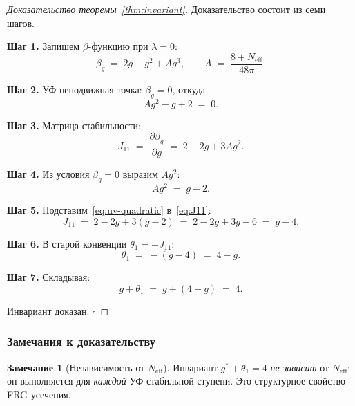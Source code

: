 \documentclass[11pt,a4paper]{article}
\theoremstyle{definition}
\newtheorem{remark}[theorem]{Замечание}
\begin{document}
\begin{proof}[Доказательство теоремы~\ref{thm:invariant}]
Доказательство состоит из семи шагов.

\medskip\noindent
\textbf{Шаг 1.} Запишем $\beta$-функцию при $\lambda = 0$:
\begin{equation}
    \beta_g \;=\; 2g - g^2 + A g^3,
    \qquad A \;=\; \frac{8 + N_{\text{eff}}}{48\pi}.
    \tag{4.1}
\end{equation}

\medskip\noindent
\textbf{Шаг 2.} УФ-неподвижная точка: $\beta_g = 0$, откуда
\begin{equation}
    A g^2 - g + 2 \;=\; 0.
    \tag{4.2}
\end{equation}

\medskip\noindent
\textbf{Шаг 3.} Матрица стабильности:
\begin{equation}
    J_{11} \;=\; \frac{\partial \beta_g}{\partial g}
    \;=\; 2 - 2g + 3 A g^2.
    \tag{4.3}
\end{equation}

\medskip\noindent
\textbf{Шаг 4.} Из условия $\beta_g = 0$ выразим $A g^2$:
\begin{equation}
    A g^2 \;=\; g - 2.
    \tag{4.4}
\end{equation}

\medskip\noindent
\textbf{Шаг 5.} Подставим~\eqref{eq:uv-quadratic} в~\eqref{eq:J11}:
\begin{equation}
    J_{11} \;=\; 2 - 2g + 3(g - 2)
    \;=\; 2 - 2g + 3g - 6
    \;=\; g - 4.
    \tag{4.5}
\end{equation}

\medskip\noindent
\textbf{Шаг 6.} В старой конвенции $\theta_1 = -J_{11}$:
\begin{equation}
    \theta_1 \;=\; -(g - 4) \;=\; 4 - g.
    \tag{4.6}
\end{equation}

\medskip\noindent
\textbf{Шаг 7.} Складывая:
\begin{equation}
    g + \theta_1 \;=\; g + (4 - g) \;=\; 4.
\end{equation}

\noindent
Инвариант доказан. $\square$
\end{proof}

\subsubsection{Замечания к доказательству}

\begin{remark}[Независимость от $N_{\text{eff}}$]
\label{rem:independence-neff}
Инвариант $g^* + \theta_1 = 4$ \emph{не зависит} от $N_{\text{eff}}$:
он выполняется для \emph{каждой} УФ-стабильной ступени. Это
структурное свойство FRG-усечения.
\end{remark}
\end{document}
